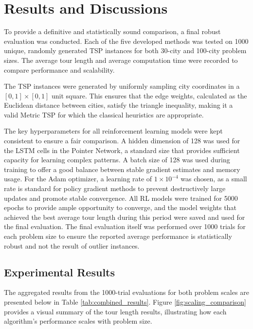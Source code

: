 \documentclass[12pt]{article}
\theoremstyle{remarkstyle}
\begin{document}
\section{Results and Discussions}
To provide a definitive and statistically sound comparison, a final robust evaluation was conducted. Each of the five developed methods was tested on 1000 unique, randomly generated TSP instances for both 30-city and 100-city problem sizes. The average tour length and average computation time were recorded to compare performance and scalability.


The TSP instances were generated by uniformly sampling city coordinates in a $[0, 1] \times [0, 1]$ unit square. This ensures that the edge weights, calculated as the Euclidean distance between cities, satisfy the triangle inequality, making it a valid Metric TSP for which the classical heuristics are appropriate.

The key hyperparameters for all reinforcement learning models were kept consistent to ensure a fair comparison. A hidden dimension of 128 was used for the LSTM cells in the Pointer Network, a standard size that provides sufficient capacity for learning complex patterns. A batch size of 128 was used during training to offer a good balance between stable gradient estimates and memory usage. For the Adam optimizer, a learning rate of $1 \times 10^{-4}$ was chosen, as a small rate is standard for policy gradient methods to prevent destructively large updates and promote stable convergence. All RL models were trained for 5000 epochs to provide ample opportunity to converge, and the model weights that achieved the best average tour length during this period were saved and used for the final evaluation. The final evaluation itself was performed over 1000 trials for each problem size to ensure the reported average performance is statistically robust and not the result of outlier instances.

\subsection{Experimental Results}
The aggregated results from the 1000-trial evaluations for both problem scales are presented below in Table \ref{tab:combined_results}. Figure \ref{fig:scaling_comparison} provides a visual summary of the tour length results, illustrating how each algorithm's performance scales with problem size.
\end{document}
